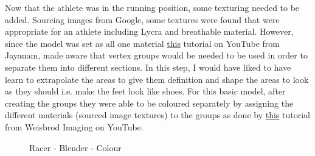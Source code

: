 \documentclass[a4 paper, 12pt]{article}
\begin{document}
Now that the athlete was in the running position, some texturing needed to be added. Sourcing images from Google, some textures were found that were appropriate for an athlete including Lycra and breathable material. However, since the model was set as all one material \href{https://www.youtube.com/watch?v=afjGodkdp4U}{this} tutorial on YouTube from Jayanam, made aware that vertex groups would be needed to be used in order to separate them into different sections. In this step, I would have liked to have learn to extrapolate the areas to give them definition and shape the areas to look as they should i.e. make the feet look like shoes. For this basic model, after creating the groups  they were able to be coloured separately by assigning the different materials (sourced image textures) to the groups as done by \href{https://www.youtube.com/watch?v=ZWJB7HaKJZY}{this} tutorial from Weisbrod Imaging on YouTube.
    \begin{figure} [H]
        \caption{Racer - Blender - Colour}   
    \end{figure}
\end{document}
